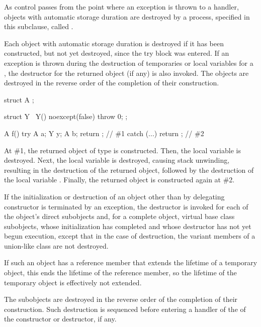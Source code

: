 \pnum
{}%
As control passes from the point where an exception is thrown
to a handler,
objects with automatic storage duration are destroyed by a process,
specified in this subclause, called .

\pnum
Each object with automatic storage duration is destroyed if it has been
constructed, but not yet destroyed,
since the try block was entered.
If an exception is thrown during the destruction of temporaries or
local variables for a ,
the destructor for the returned object (if any) is also invoked.
The objects are destroyed in the reverse order of the completion
of their construction.
\begin{example}
\begin{codeblock}
struct A { };

struct Y { ~Y() noexcept(false) { throw 0; } };

A f() {
  try {
    A a;
    Y y;
    A b;
    return {};      // \#1
  } catch (...) {
  }
  return {};        // \#2
}
\end{codeblock}
At \#1, the returned object of type  is constructed.
Then, the local variable  is destroyed.
Next, the local variable  is destroyed,
causing stack unwinding,
resulting in the destruction of the returned object,
followed by the destruction of the local variable .
Finally, the returned object is constructed again at \#2.
\end{example}

\pnum
If the initialization or destruction of an object
other than by delegating constructor
is terminated by an exception,
the destructor is invoked for
each of the object's direct subobjects
and, for a complete object, virtual base class subobjects,
whose initialization has completed
and whose destructor has not yet begun execution,
except that in the case of destruction, the variant members of a
union-like class are not destroyed.
\begin{note}
If such an object has a reference member
that extends the lifetime of a temporary object,
this ends the lifetime of the reference member,
so the lifetime of the temporary object is effectively not extended.
\end{note}
The subobjects are destroyed in the reverse order of the completion of
their construction. Such destruction is sequenced before entering a
handler of the  of the constructor or destructor,
if any.

